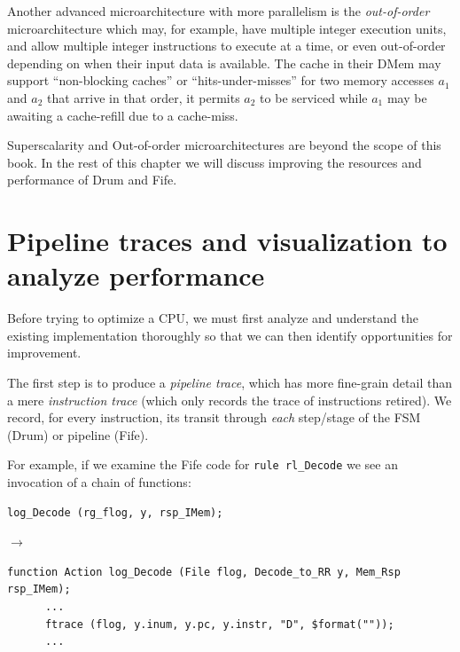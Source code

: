 
Another advanced microarchitecture with more parallelism is the
\emph{out-of-order} microarchitecture which may, for example, have
multiple integer execution units, and allow multiple integer
instructions to execute at a time, or even out-of-order depending on
when their input data is available.  The cache in their DMem may
support ``non-blocking caches'' or ``hits-under-misses'' {\ie} for two
memory accesses $a_1$ and $a_2$ that arrive in that order, it permits
$a_2$ to be serviced while $a_1$ may be awaiting a cache-refill due to
a cache-miss.

Superscalarity and Out-of-order microarchitectures are beyond the
scope of this book.  In the rest of this chapter we will discuss
improving the resources and performance of Drum and Fife.


\section{Pipeline traces and visualization to analyze performance}

Before trying to optimize a CPU, we must first analyze and understand
the existing implementation thoroughly so that we can then identify
opportunities for improvement.


The first step is to produce a \emph{pipeline trace}, which has more
fine-grain detail than a mere \emph{instruction trace} (which only
records the trace of instructions retired).  We record, for every
instruction, its transit through \emph{each} step/stage of the FSM
(Drum) or pipeline (Fife).

For example, if we examine the Fife code for \verb|rule rl_Decode| we
see an invocation of a chain of functions:

{\small
\begin{Verbatim}[frame=single, label=src\_Fife/S2\_Decode.bsv]
      log_Decode (rg_flog, y, rsp_IMem);
\end{Verbatim}
}

$\longrightarrow$

{\small
\begin{Verbatim}[frame=single, label=src\_Common/Fn\_Decode.bsv]
   function Action log_Decode (File flog, Decode_to_RR y, Mem_Rsp rsp_IMem);
      ...
      ftrace (flog, y.inum, y.pc, y.instr, "D", $format(""));
      ...
\end{Verbatim}
}

